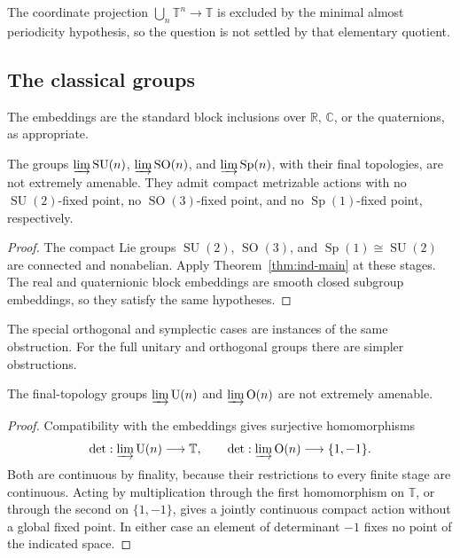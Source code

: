 The coordinate projection $\bigcup_n\mathbb T^n\to\mathbb T$ is excluded by the
minimal almost periodicity hypothesis, so the question is not settled
by that elementary quotient.


\subsection{The classical groups}\label{sec:ind-classical}

The embeddings are the standard block inclusions over
$\mathbb R$, $\mathbb C$, or the quaternions, as appropriate.

\begin{corollary}\label{cor:ind-semisimple-classical}
The groups $\varinjlim\operatorname{SU}(n)$, $\varinjlim\operatorname{SO}(n)$, and
$\varinjlim\operatorname{Sp}(n)$, with their final topologies, are not extremely
amenable. They admit compact metrizable actions with no
$\operatorname{SU}(2)$-fixed point, no $\operatorname{SO}(3)$-fixed point, and no
$\operatorname{Sp}(1)$-fixed point, respectively.
\end{corollary}

\begin{proof}
The compact Lie groups $\operatorname{SU}(2)$, $\operatorname{SO}(3)$, and
$\operatorname{Sp}(1)\cong\operatorname{SU}(2)$ are connected and nonabelian. Apply
Theorem~\ref{thm:ind-main} at these stages. The real and quaternionic block
embeddings are smooth closed subgroup embeddings, so they satisfy the
same hypotheses.
\end{proof}

The special orthogonal and symplectic cases are instances of the
same obstruction. For the full unitary and orthogonal groups there
are simpler obstructions.

\begin{proposition}\label{prop:ind-determinants}
The final-topology groups $\varinjlim\operatorname{U}(n)$ and
$\varinjlim\operatorname{O}(n)$ are not extremely amenable.
\end{proposition}

\begin{proof}
Compatibility with the embeddings gives surjective homomorphisms
\[
\det:\varinjlim\operatorname{U}(n)\longrightarrow\mathbb T,
\qquad
\det:\varinjlim\operatorname{O}(n)\longrightarrow\{1,-1\}.
\]
Both are continuous by finality, because their restrictions to every
finite stage are continuous. Acting by multiplication through the
first homomorphism on $\mathbb T$, or through the second on $\{1,-1\}$,
gives a jointly continuous compact action without a global fixed
point. In either case an element of determinant $-1$ fixes no point
of the indicated space.
\end{proof}

